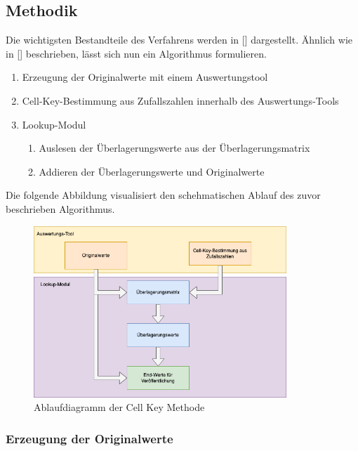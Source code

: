 \subsection{Methodik}%

Die wichtigsten Bestandteile des Verfahrens werden in [\cite{Enderle}] dargestellt. Ähnlich wie in [\cite{Wipke}] beschrieben, lässt sich nun ein Algorithmus formulieren.

\begin{enumerate}
    \item Erzeugung der Originalwerte mit einem Auswertungstool
    \item Cell-Key-Bestimmung aus Zufallszahlen innerhalb des Auswertungs-Tools
    \item Lookup-Modul
    \begin{enumerate}
        \item Auslesen der Überlagerungswerte aus der Überlagerungsmatrix
        \item Addieren der Überlagerungswerte und Originalwerte
    \end{enumerate}
\end{enumerate}

Die folgende Abbildung visualisiert den schehmatischen Ablauf des zuvor beschrieben Algorithmus.

\begin{figure}[H]
    \begin{center}
        \includegraphics[width=0.85\textwidth]{img/ckm_flow.png}
        \caption{Ablaufdiagramm der Cell Key Methode}
    \end{center}
\end{figure}

\subsubsection{Erzeugung der Originalwerte}

